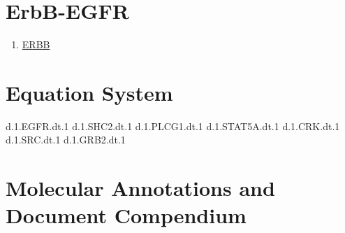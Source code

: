 
\section{ErbB-EGFR}

\begin{enumerate}
\item \href{https://www.genome.jp/kegg-bin/show_pathway?map=hsa04012&show_description=show}{ERBB}

\end{enumerate}

\section{Equation System}

d.1.EGFR.dt.1 
d.1.SHC2.dt.1 
d.1.PLCG1.dt.1 
d.1.STAT5A.dt.1 
d.1.CRK.dt.1 
d.1.SRC.dt.1 
d.1.GRB2.dt.1  


\section{Molecular Annotations and Document Compendium}

